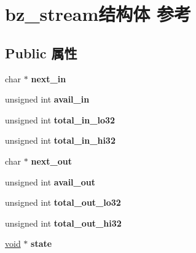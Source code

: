 \hypertarget{structbz__stream}{}\section{bz\+\_\+stream结构体 参考}
\label{structbz__stream}
\subsection*{Public 属性}
\begin{DoxyCompactItemize}
\item 
\mbox{\label{structbz__stream_aa4a76b5c671cc4092ad7417f2731b894}} 
char $\ast$ {\bfseries next\+\_\+in}
\item 
\mbox{\label{structbz__stream_a3b4296261f93965fc477277c410603af}} 
unsigned int {\bfseries avail\+\_\+in}
\item 
\mbox{\label{structbz__stream_aacacdc7f753d7eab8652592bd15dbe6e}} 
unsigned int {\bfseries total\+\_\+in\+\_\+lo32}
\item 
\mbox{\label{structbz__stream_af5833cfbe5e07a89c9f33783f323c218}} 
unsigned int {\bfseries total\+\_\+in\+\_\+hi32}
\item 
\mbox{\label{structbz__stream_ad27d0acafb3b84aada276b157e9aef04}} 
char $\ast$ {\bfseries next\+\_\+out}
\item 
\mbox{\label{structbz__stream_a749a8dd37243c6b76f81de5cd2a24e2e}} 
unsigned int {\bfseries avail\+\_\+out}
\item 
\mbox{\label{structbz__stream_a7befd6f6ace94f7df3aac07ad48f944b}} 
unsigned int {\bfseries total\+\_\+out\+\_\+lo32}
\item 
\mbox{\label{structbz__stream_a8906ddf3e4fcc6963ef6680157647001}} 
unsigned int {\bfseries total\+\_\+out\+\_\+hi32}
\item 
\mbox{\label{structbz__stream_a7b976d082aba4d851eea25a308d96ee8}} 
\hyperlink{interfacevoid}{void} $\ast$ {\bfseries state}
\item 

\end{DoxyCompactItemize}
